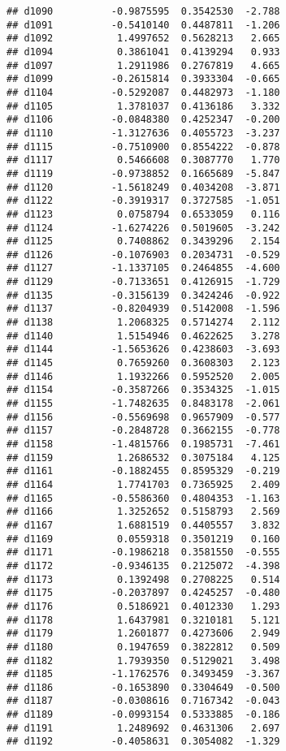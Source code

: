 \documentclass[
]{article}
\begin{document}
\begin{verbatim}
## d1090          -0.9875595  0.3542530  -2.788
## d1091          -0.5410140  0.4487811  -1.206
## d1092           1.4997652  0.5628213   2.665
## d1094           0.3861041  0.4139294   0.933
## d1097           1.2911986  0.2767819   4.665
## d1099          -0.2615814  0.3933304  -0.665
## d1104          -0.5292087  0.4482973  -1.180
## d1105           1.3781037  0.4136186   3.332
## d1106          -0.0848380  0.4252347  -0.200
## d1110          -1.3127636  0.4055723  -3.237
## d1115          -0.7510900  0.8554222  -0.878
## d1117           0.5466608  0.3087770   1.770
## d1119          -0.9738852  0.1665689  -5.847
## d1120          -1.5618249  0.4034208  -3.871
## d1122          -0.3919317  0.3727585  -1.051
## d1123           0.0758794  0.6533059   0.116
## d1124          -1.6274226  0.5019605  -3.242
## d1125           0.7408862  0.3439296   2.154
## d1126          -0.1076903  0.2034731  -0.529
## d1127          -1.1337105  0.2464855  -4.600
## d1129          -0.7133651  0.4126915  -1.729
## d1135          -0.3156139  0.3424246  -0.922
## d1137          -0.8204939  0.5142008  -1.596
## d1138           1.2068325  0.5714274   2.112
## d1140           1.5154946  0.4622625   3.278
## d1144          -1.5653626  0.4238603  -3.693
## d1145           0.7659260  0.3608303   2.123
## d1146           1.1932266  0.5952520   2.005
## d1154          -0.3587266  0.3534325  -1.015
## d1155          -1.7482635  0.8483178  -2.061
## d1156          -0.5569698  0.9657909  -0.577
## d1157          -0.2848728  0.3662155  -0.778
## d1158          -1.4815766  0.1985731  -7.461
## d1159           1.2686532  0.3075184   4.125
## d1161          -0.1882455  0.8595329  -0.219
## d1164           1.7741703  0.7365925   2.409
## d1165          -0.5586360  0.4804353  -1.163
## d1166           1.3252652  0.5158793   2.569
## d1167           1.6881519  0.4405557   3.832
## d1169           0.0559318  0.3501219   0.160
## d1171          -0.1986218  0.3581550  -0.555
## d1172          -0.9346135  0.2125072  -4.398
## d1173           0.1392498  0.2708225   0.514
## d1175          -0.2037897  0.4245257  -0.480
## d1176           0.5186921  0.4012330   1.293
## d1178           1.6437981  0.3210181   5.121
## d1179           1.2601877  0.4273606   2.949
## d1180           0.1947659  0.3822812   0.509
## d1182           1.7939350  0.5129021   3.498
## d1185          -1.1762576  0.3493459  -3.367
## d1186          -0.1653890  0.3304649  -0.500
## d1187          -0.0308616  0.7167342  -0.043
## d1189          -0.0993154  0.5333885  -0.186
## d1191           1.2489692  0.4631306   2.697
## d1192          -0.4058631  0.3054082  -1.329

\end{verbatim}
\end{document}
